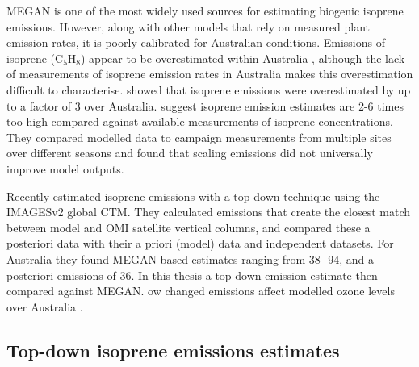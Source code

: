     MEGAN is one of the most widely used sources for estimating biogenic isoprene emissions.
    However, along with other models that rely on measured plant emission rates, it is poorly calibrated for Australian conditions.
    Emissions of isoprene (C$_5$H$_8$) appear to be overestimated within Australia \parencite{Sindelarova2014,Stavrakou2014,Emmerson2016}, although the lack of measurements of isoprene emission rates in Australia makes this overestimation difficult to characterise.
    \textcite{Bauwens2016} showed that isoprene emissions were overestimated by up to a factor of 3 over Australia.
    \textcite{Emmerson2016} suggest isoprene emission estimates are 2-6 times too high compared against available measurements of isoprene concentrations.
    They compared modelled data to campaign measurements from multiple sites over different seasons and found that scaling emissions did not universally improve model outputs.
    

    Recently \textcite{Bauwens2016} estimated isoprene emissions with a top-down technique using the IMAGESv2 global CTM.
    They calculated emissions that create the closest match between model and OMI satellite vertical columns, and compared these a posteriori data with their a priori (model) data and independent datasets.
    For Australia they found %
    MEGAN based estimates ranging from 38\tgcpyr - 94\tgcpyr, and a posteriori emissions of 36\tgcpyr.
    In this thesis  a top-down emission estimate  then compared against MEGAN. 
    ow changed emissions affect modelled ozone levels over Australia .
  
  \subsection{Top-down isoprene emissions estimates}
    \label{BioIsop:intro:top_down_estimates}
    
